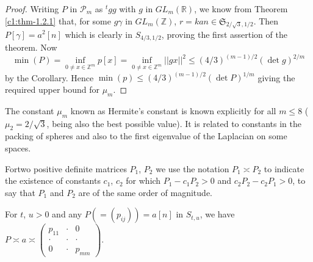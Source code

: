 \begin{proof}
Writing $P$ in $\mathscr{P}_{m}$ as ${}^{t}gg$ with $g$ in
$GL_{m}(\mathbb{R})$, we know from Theorem \ref{c1:thm-1.2.1} that, for
some $g\gamma$ in $GL_{m}(\mathbb{Z})$, $r=kan\in
\mathfrak{S}_{2/\sqrt{3},1/2}$. Then $P[\gamma]=a^{2}[n]$ which is
clearly in $S_{4/3,1/2}$, proving the first assertion of the
theorem. Now
$$
\min (P)=\inf\limits_{0\neq x\in
  \mathbb{Z}^{m}}p[x]=\inf\limits_{0\neq x\in
  \mathbb{Z}^{m}}||gx||^{2}\leq (4/3)^{(m-1)/2}(\det g)^{2/m} 
$$
by the Corollary. Hence $\min (p)\leq (4/3)^{(m-1)/2}(\det P)^{1/m}$
giving the required upper bound for $\mu_{m}$.
\end{proof}

\begin{remark*}
The constant $\mu_{m}$ known as Hermite's constant is known explicitly
for all $m\leq 8$ (\eg $\mu_{2}=2/\sqrt{3}$, being also the best
possible value). It is related to constants in the packing of spheres
and also to the first eigenvalue of the Laplacian on some spaces. 
\end{remark*}

For\pageoriginale two positive definite matrices $P_{1}$, $P_{2}$ we
use the notation $P_{1}\asymp P_{2}$ to indicate the existence of
constants $c_{1}$, $c_{2}$ for which $P_{1}-c_{1}P_{2}>0$ and
$c_{2}P_{2}-c_{2}P_{1}>0$, \ie to say that $P_{1}$ and $P_{2}$ are of
the same order of magnitude.

\begin{subtheorem}\label{c1:thm-1.2.6}
For $t$, $u>0$ and any $P(=(p_{ij}))=a[n]$ in $S_{t,u}$, we have
$P \asymp a \asymp \left(\begin{smallmatrix} p_{11} & \cdot & 0\\ \cdot
  & \cdot & \cdot\\
0 & \cdot & p_{mm}\end{smallmatrix}\right)$.
\end{subtheorem}

